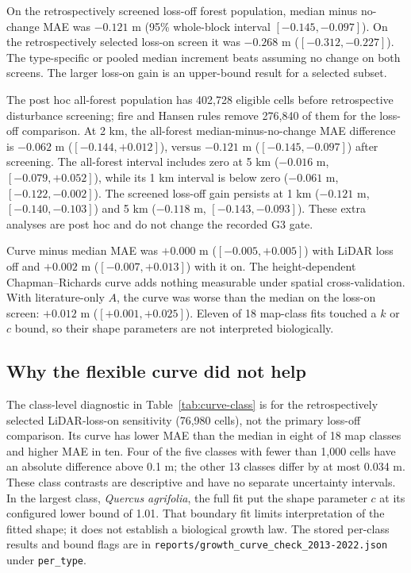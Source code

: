 \documentclass[11pt]{article}
\begin{document}
On the retrospectively screened loss-off forest population, median
minus no-change MAE was $-0.121$ m
(95\% whole-block interval $[-0.145,-0.097]$). On the retrospectively
selected loss-on screen it was $-0.268$ m ($[-0.312,-0.227]$).
The type-specific or pooled median increment beats assuming no change
on both screens. The larger loss-on gain is an upper-bound result for
a selected subset.

The post hoc all-forest population has 402,728 eligible cells before
retrospective disturbance screening; fire and Hansen rules remove
276,840 of them for the loss-off comparison. At 2 km, the all-forest
median-minus-no-change MAE difference is $-0.062$ m
($[-0.144,+0.012]$), versus $-0.121$ m
($[-0.145,-0.097]$) after screening. The all-forest interval includes
zero at 5 km ($-0.016$ m, $[-0.079,+0.052]$), while its 1 km interval
is below zero ($-0.061$ m, $[-0.122,-0.002]$). The screened loss-off
gain persists at 1 km ($-0.121$ m, $[-0.140,-0.103]$) and 5 km
($-0.118$ m, $[-0.143,-0.093]$). These extra analyses are post hoc
and do not change the recorded G3 gate.

Curve minus median MAE was $+0.000$ m ($[-0.005,+0.005]$) with LiDAR
loss off and $+0.002$ m ($[-0.007,+0.013]$) with it on. The
height-dependent Chapman--Richards curve adds nothing measurable
under spatial cross-validation. With literature-only $A$, the curve
was worse than the median on the loss-on screen: $+0.012$ m
($[+0.001,+0.025]$). Eleven of 18 map-class fits touched a $k$
or $c$ bound, so their shape parameters are not interpreted biologically.

\subsection{Why the flexible curve did not help}
The class-level diagnostic in Table~\ref{tab:curve-class} is for the
retrospectively selected LiDAR-loss-on sensitivity (76,980 cells), not
the primary loss-off comparison. Its curve has lower MAE than the
median in eight of 18 map classes and higher MAE in ten. Four of the
five classes with fewer than 1,000 cells have an absolute difference
above 0.1 m; the other 13 classes differ by at most 0.034 m. These
class contrasts are descriptive and have no separate uncertainty
intervals. In the largest class, \emph{Quercus agrifolia}, the full fit
put the shape parameter $c$ at its configured lower bound of 1.01.
That boundary fit limits interpretation of the fitted shape; it does
not establish a biological growth law. The stored per-class results
and bound flags are in
\texttt{reports/growth\_curve\_check\_2013-2022.json} under
\texttt{per\_type}.
\end{document}
